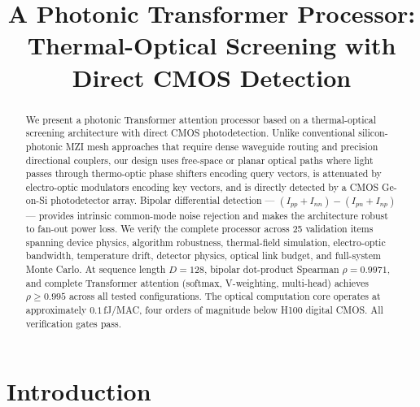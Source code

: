 \documentclass[conference]{IEEEtran}
\begin{document}
\title{A Photonic Transformer Processor:\\Thermal-Optical Screening with Direct CMOS Detection}

\author{
}

\maketitle

\begin{abstract}
We present a photonic Transformer attention processor based on a
thermal-optical screening architecture with direct CMOS photodetection.
Unlike conventional silicon-photonic MZI mesh approaches that require
dense waveguide routing and precision directional couplers, our design
uses free-space or planar optical paths where light passes through
thermo-optic phase shifters encoding query vectors, is attenuated by
electro-optic modulators encoding key vectors, and is directly detected
by a CMOS Ge-on-Si photodetector array. Bipolar differential detection
--- $(I_{pp}+I_{nn})-(I_{pn}+I_{np})$ --- provides intrinsic
common-mode noise rejection and makes the architecture robust to
fan-out power loss. We verify the complete processor across 25
validation items spanning device physics, algorithm robustness,
thermal-field simulation, electro-optic bandwidth, temperature drift,
detector physics, optical link budget, and full-system Monte Carlo.
At sequence length $D=128$, bipolar dot-product Spearman $\rho=0.9971$,
and complete Transformer attention (softmax, V-weighting, multi-head)
achieves $\rho\ge0.995$ across all tested configurations. The optical
computation core operates at approximately $0.1$\,fJ/MAC, four orders
of magnitude below H100 digital CMOS. All verification gates pass.
\end{abstract}

\section{Introduction}
\end{document}
